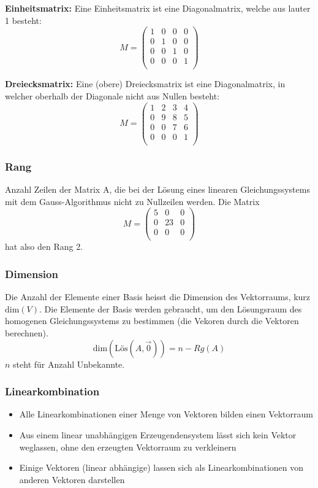 \textbf{Einheitsmatrix:} Eine Einheitsmatrix ist eine Diagonalmatrix,
welche aus lauter 1 besteht:
\[ M = \begin {pmatrix}
 1  & 0  & 0  & 0 \\
 0  & 1  & 0  & 0 \\
 0  & 0  & 1  & 0 \\
 0  & 0  & 0  & 1 \\
\end {pmatrix} \]

\textbf{Dreiecksmatrix:} Eine (obere) Dreiecksmatrix ist eine Diagonalmatrix,
in welcher oberhalb der Diagonale nicht aus Nullen besteht:
\[ M = \begin {pmatrix}
 1  & 2  & 3  & 4 \\
 0  & 9  & 8  & 5 \\
 0  & 0  & 7  & 6 \\
 0  & 0  & 0  & 1 \\
\end {pmatrix} \]

\subsubsection{Rang}
Anzahl Zeilen der Matrix A, die bei der Lösung eines linearen
Gleichungssystems mit dem Gauss-Algorithmus nicht zu Nullzeilen werden.
Die Matrix
\[ M = \begin {pmatrix}
 5  & 0  & 0 \\
 0  & 23  & 0 \\
 0  & 0  & 0 \\
\end {pmatrix} \]
hat also den Rang 2.

\subsubsection{Dimension}
Die Anzahl der Elemente einer Basis heisst die Dimension des Vektorraums, kurz \( \text{dim}(V) \). Die Elemente der Basis werden gebraucht, um den Lösungsraum des homogenen Gleichungssystems zu bestimmen (die  Vekoren durch die  Vektoren berechnen). 
\[ \text{dim}(\text{Lös}(A, \vec{0})) = n - Rg(A)\]
\( n \) steht für Anzahl Unbekannte. 

\subsubsection{Linearkombination}
\begin{itemize}
  \item Alle Linearkombinationen einer Menge von Vektoren bilden einen
  Vektorraum
  \item Aus einem linear unabhängigen Erzeugendensystem lässt sich kein Vektor
    weglassen, ohne den erzeugten Vektorraum zu verkleinern
  \item Einige Vektoren (linear abhängige) lassen sich als Linearkombinationen von anderen
  Vektoren darstellen
\end{itemize}


